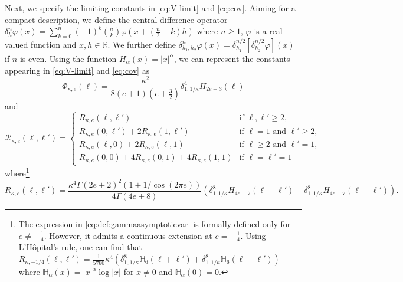 \documentclass[ecta,nameyear,draft]{econsocart}
\newcommand{\1}{\mathbf 1}
\newcommand{\calR}{\mathcal{R}}
\numberwithin{equation}{section}
\newcommand{\R}{\mathbb{R}}
\renewcommand{\H}{\mathbb{H}}
\newcommand{\al}{{\alpha}}
\newcommand{\Ga}{{\Gamma}}
\newcommand{\vp}{{\varphi}}
\begin{document}
\begin{appendix}
Next, we specify the limiting constants   in \eqref{eq:V-limit} and \eqref{eq:cov}. Aiming for a compact description, we define the central difference operator $\delta^n_h \vp(x) = \sum_{k=0}^n (-1)^k \binom{n}{k}\vp(x+(\frac n2-k)h)$ where $n\geq1$, $\vp$ is  a real-valued function and $x,h\in\R$. We further define $\delta^n_{h_1,h_2}\vp(x) = \delta^{n/2}_{h_1}[\delta^{n/2}_{h_2}\vp](x)$ if $n$ is even. Using the function  $H_\al(x)= \lvert x\rvert^\al$, we can represent the constants appearing in   \eqref{eq:V-limit} and \eqref{eq:cov} as
	\begin{equation}\label{eq:def:phi}
			\Phi_{\kappa,e}(\ell) =\frac{\kappa^2}{8 (e+1)(e+\tfrac32)}\delta^4_{1,1/\kappa}H_{2e+3}(\ell)
	\end{equation}
and
\begin{equation}\label{eq:R}
\calR_{\kappa,e}(\ell,\ell')
	= 
	\begin{cases}
 R_{\kappa,e}(\ell,\ell')
		&
		\text{if } \ell, \ell'\geq 2,
		\\
	 R_{\kappa,e}(0,\ell')+2 R_{\kappa,e}(1,\ell')
		&
		\text{if } \ell = 1 \text{ and } \ell' \geq 2,
		\\
 R_{\kappa,e}(\ell,0)+2 R_{\kappa,e}(\ell,1)
		&
		\text{if } \ell \geq 2 \text{ and } \ell' = 1,
		\\
 R_{\kappa,e}(0,0)+4 R_{\kappa,e}(0,1)+4 R_{\kappa,e}(1,1)
		&
		\text{if } \ell  = \ell'= 1
	\end{cases}
\end{equation}
where\footnote{The expression in \eqref{eq:def:gammaasymptoticvar} is formally defined only for $e\neq -\frac14$. However, it admits a continuous extension at $e=-\frac14$. Using L'H\^opital's rule, one can find that $R_{\kappa,-1/4}(\ell,\ell')= \frac1{5760}\kappa^4  ( \delta^{8}_{1,1/\kappa} \H_6(\ell+\ell')+ \delta^{8}_{1,1/\kappa} \H_6(\ell-\ell'))$ where $\H_\al(x) = \lvert x\rvert^\al\log \lvert x\rvert$ for $x\neq0$ and $\H_\al(0) = 0$.}  
\begin{equation}
	\label{eq:def:gammaasymptoticvar}
	R_{\kappa,e}(\ell,\ell') = \frac{\kappa^4\Ga(2e+2)^2(1+1/\cos(2\pi e))}{4\Ga(4e+8)}(\delta^8_{1,1/\kappa}H_{4e+7}(\ell+\ell')+\delta^8_{1,1/\kappa}H_{4e+7}(\ell-\ell')).

\end{equation}
\end{appendix}
\end{document}
